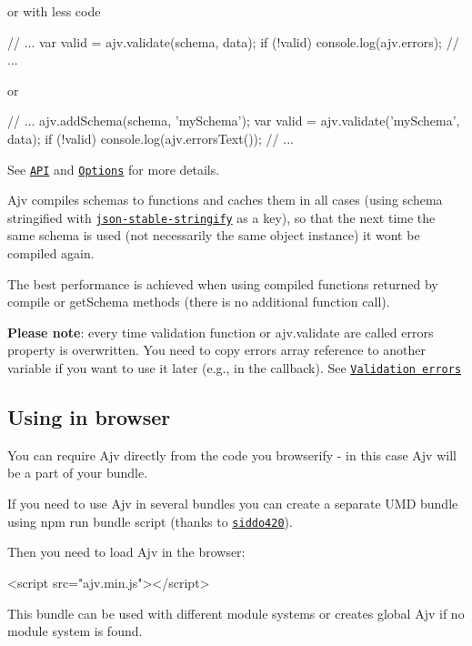 or with less code


\begin{DoxyCode}
// ...
var valid = ajv.validate(schema, data);
if (!valid) console.log(ajv.errors);
// ...
\end{DoxyCode}


or


\begin{DoxyCode}
// ...
ajv.addSchema(schema, 'mySchema');
var valid = ajv.validate('mySchema', data);
if (!valid) console.log(ajv.errorsText());
// ...
\end{DoxyCode}


See \href{#api}{\tt A\+PI} and \href{#options}{\tt Options} for more details.

Ajv compiles schemas to functions and caches them in all cases (using schema stringified with \href{https://github.com/substack/json-stable-stringify}{\tt json-\/stable-\/stringify} as a key), so that the next time the same schema is used (not necessarily the same object instance) it won\textquotesingle{}t be compiled again.

The best performance is achieved when using compiled functions returned by {\ttfamily compile} or {\ttfamily get\+Schema} methods (there is no additional function call).

{\bfseries Please note}\+: every time validation function or {\ttfamily ajv.\+validate} are called {\ttfamily errors} property is overwritten. You need to copy {\ttfamily errors} array reference to another variable if you want to use it later (e.\+g., in the callback). See \href{#validation-errors}{\tt Validation errors}

\subsection*{Using in browser}

You can require Ajv directly from the code you browserify -\/ in this case Ajv will be a part of your bundle.

If you need to use Ajv in several bundles you can create a separate U\+MD bundle using {\ttfamily npm run bundle} script (thanks to \href{https://github.com/siddo420}{\tt siddo420}).

Then you need to load Ajv in the browser\+: 
\begin{DoxyCode}
<script src="ajv.min.js"></script>
\end{DoxyCode}


This bundle can be used with different module systems or creates global {\ttfamily Ajv} if no module system is found.

